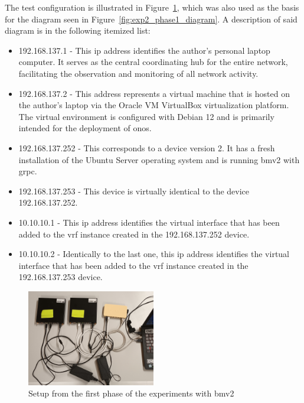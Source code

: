 The test configuration is illustrated in Figure~\ref{fig:exp2_phase1_setup}, which was also used as the basis for the diagram seen in Figure~\ref{fig:exp2_phase1_diagram}. A description of said diagram is in the following itemized list:
\begin{itemize}
	\item 192.168.137.1 - This \gls{ip} address identifies the author's personal laptop computer. It serves as the central coordinating hub for the entire network, facilitating the observation and monitoring of all network activity.
	\item 192.168.137.2 - This address represents a virtual machine that is hosted on the author's laptop via the Oracle VM VirtualBox virtualization platform. The virtual environment is configured with Debian 12 and is primarily intended for the deployment of \gls{onos}.
	\item 192.168.137.252 - This corresponds to a device version 2. It has a fresh installation of the Ubuntu Server operating system and is running \gls{bmv2} with grpc.
	\item 192.168.137.253 - This device is virtually identical to the device 192.168.137.252.
	\item 10.10.10.1 - This \gls{ip} address identifies the virtual interface that has been added to the \gls{vrf} instance created in the 192.168.137.252 device.
	\item 10.10.10.2 - Identically to the last one, this \gls{ip} address identifies the virtual interface that has been added to the \gls{vrf} instance created in the 192.168.137.253 device.
\end{itemize}

\begin{figure}
	\centering
	\includegraphics[width=0.5\textwidth]{Chapters/Figures/tests/bmv2_phase_1/20241122_185833.jpg}
	\caption{Setup from the first phase of the experiments with \gls{bmv2}}
	\label{fig:exp2_phase1_setup}
\end{figure}

